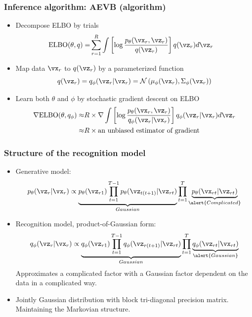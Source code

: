 \documentclass[16pt,presentation]{beamer}
\begin{document}
\begin{frame}
\frametitle{Inference algorithm: AEVB (algorithm)}
\begin{itemize}
\item Decompose ELBO by trials
\[\begin{split}
\text{ELBO}(\theta, q) %
=& \sum_{r=1}^{R} \int \left[\log \frac{p_{\theta}(\vx_r, \vz_r)}{q(\vz_r)}\right] q(\vz_r) d\vz_r 
\end{split}\]
\item Map data $\vx_r$ to $q(\vz_r)$ by a parameterized function
\[q(\vz_r) = q_\phi(\vz_r | \vx_r) = \N\left(\mu_\phi(\vx_r), \Sigma_\phi(\vx_r)\right)\]
\item Learn both $\theta$ and $\phi$ by \alert{stochastic} gradient descent on ELBO
\[\begin{split}
\grad\text{ELBO}(\theta, q_\phi) \approx& R \times \grad \int \left[\log \frac{p_{\theta}(\vx_r, \vz_r)}{q_\phi(\vz_r | \vx_r)}\right] q_\phi(\vz_r| \vx_r) d\vz_r\\
\approx& R \times \text{an unbiased estimator of gradient} %
\end{split}\]
\end{itemize}
\end{frame}

\begin{frame}
\frametitle{Structure of the recognition model}
\begin{itemize}
\item Generative model:
\[p_\theta(\vz_r | \vx_r) \propto \underbrace{p_\theta(\vz_{r1})
\prod_{t=1}^{T-1}p_\theta(\vz_{t(t+1)} | \vz_{rt})}_{Gaussian} 
\prod_{t=1}^T \underbrace{p_\theta(\vx_{rt} | \vz_{rt})}_{\alert{Complicated}}
\]
\item Recognition model, product-of-Gaussian form:
\[q_\phi(\vz_r | \vx_r) \propto \underbrace{q_\phi(\vz_{r1}) 
\prod_{t=1}^{T-1}q_\phi(\vz_{r(t+1)} | \vz_{rt}) }_{Gaussian}
\prod_{t=1}^T \underbrace{q_\phi(\vz_{rt} | \vx_{rt})}_{\alert{Gaussian}}
\]
Approximates a complicated factor with a Gaussian factor dependent on the data in a complicated way.
\item Jointly Gaussian distribution with block tri-diagonal precision matrix. Maintaining the Markovian structure.
\end{itemize}
\end{frame}
\end{document}
